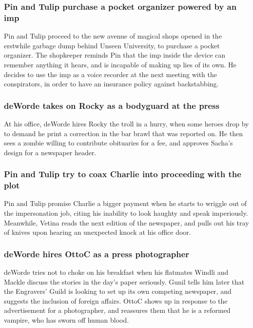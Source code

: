 \subsubsection{\Gls{Pin} and \Gls{Tulip} purchase a pocket organizer powered by an imp}
\Gls{Pin} and \Gls{Tulip} proceed to the new avenue of magical shops opened in the erstwhile
garbage dump behind Unseen University, to purchase a pocket organizer. The shopkeeper reminds
\Gls{Pin} that the imp inside the device can remember anything it hears, and is incapable of making
up lies of its own. He decides to use the imp as a voice recorder at the next meeting with the
conspirators, in order to have an insurance policy against backstabbing.

\subsubsection{\Gls{deWorde} takes on \Gls{Rocky} as a bodyguard at the press}
At his office, \Gls{deWorde} hires \Gls{Rocky} the troll in a hurry, when some heroes drop by to
demand he print a correction in the bar brawl that was reported on. He then sees a zombie willing
to contribute obituaries for a fee, and approves \Gls{Sacha}'s design for a newspaper header.

\subsubsection{\Gls{Pin} and \Gls{Tulip} try to coax \Gls{Charlie} into proceeding with the plot}
\Gls{Pin} and \Gls{Tulip} promise \Gls{Charlie} a bigger payment when he starts to wriggle out of
the impersonation job, citing his inability to look haughty and speak imperiously. Meanwhile,
\Gls{Vetina} reads the next edition of the newspaper, and pulls out his tray of knives upon hearing
an unexpected knock at his office door.

\subsubsection{\Gls{deWorde} hires \Gls{OttoC} as a press photographer}
\Gls{deWorde} tries not to choke on his breakfast when his flatmates \Gls{Windli} and \Gls{Mackle}
discuss the stories in the day's paper seriously. \Gls{Gunil} tells him later that the Engravers'
Guild is looking to set up its own competing newspaper, and suggests the inclusion of foreign
affairs. \Gls{OttoC} shows up in response to the advertisement for a photographer, and reassures
them that he is a reformed vampire, who has sworn off human blood.

